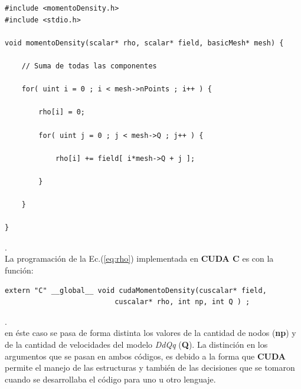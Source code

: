 {\footnotesize
	\begin{frame}{}
		\begin{lstlisting}[frame=single]
#include <momentoDensity.h>
#include <stdio.h>

void momentoDensity(scalar* rho, scalar* field, basicMesh* mesh) {
	
	// Suma de todas las componentes
	
	for( uint i = 0 ; i < mesh->nPoints ; i++ ) {
		
		rho[i] = 0;	    
		
		for( uint j = 0 ; j < mesh->Q ; j++ ) {
		
			rho[i] += field[ i*mesh->Q + j ];
		
		}	
			
	}
	
}
		\end{lstlisting}
		
	\end{frame}
}.
\\

La programación de la Ec.(\ref{eq:rho}) implementada en \textbf{CUDA C} es con la función:

{\scriptsize
	\begin{frame}{}
		\begin{lstlisting}
extern "C" __global__ void cudaMomentoDensity(cuscalar* field,
					      cuscalar* rho, int np, int Q ) ; 
		\end{lstlisting}
		
	\end{frame}
}.
\\
en éste caso se pasa de forma distinta los valores de la cantidad de nodos (\textbf{np}) y de la cantidad de velocidades del modelo \textit{DdQq} (\textbf{Q}). La distinción en los argumentos que se pasan en ambos códigos, es debido a la forma que \textbf{CUDA} permite el manejo de las estructuras y también de las decisiones que se tomaron cuando se desarrollaba el código para uno u otro lenguaje.

